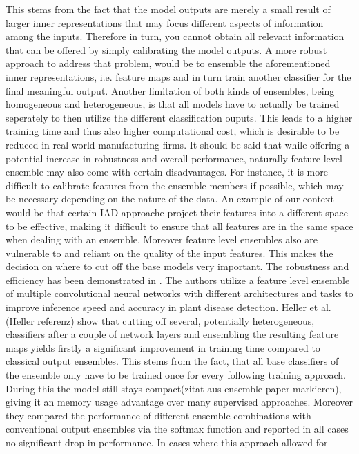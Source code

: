 This stems from the fact that the model outputs are merely a small result of larger inner representations that may focus different aspects 
of information among the inputs. Therefore in turn, you cannot obtain all relevant information that can be offered by simply calibrating the 
model outputs. A more robust approach to address that problem, would be to ensemble the aforementioned inner representations, i.e. feature maps 
and in turn train another classifier for the final meaningful output.
Another limitation of both kinds of ensembles, being homogeneous and heterogeneous, is that all models have to actually be trained 
seperately to then utilize the different classification ouputs. This leads to a higher training time and thus also higher computational 
cost, which is desirable to be reduced in real world manufacturing firms.
It should be said that while offering a potential increase in robustness and overall performance, naturally feature level ensemble may also 
come with certain disadvantages. For instance, it is more difficult to calibrate features from the ensemble members if possible, which may 
be necessary depending on the nature of the data. An example of our context would be that certain IAD approache project their features into a 
different space to be effective, making it difficult to ensure that all features are in the same space when dealing with an ensemble. 
Moreover feature level ensembles also are vulnerable to and reliant on the quality of the input features. This makes the decision on where 
to cut off the base models very important.
The robustness and efficiency has been demonstrated in \cite{EnsembleHeller2023}. The authors utilize a feature level ensemble of multiple 
convolutional neural networks with different architectures and tasks to improve inference speed and accuracy in plant disease detection.
Heller et al.(Heller referenz) show that cutting off several, potentially heterogeneous, classifiers after a couple of network layers and ensembling the 
resulting feature maps yields firstly a significant improvement in training time compared to classical output ensembles. This stems from 
the fact, that all base classifiers of the ensemble only have to be trained once for every following training approach. During this the 
model still stays compact(zitat aus ensemble paper markieren), giving it an memory usage advantage over many supervised approaches. 
Moreover they compared the performance of different ensemble combinations with conventional 
output ensembles via the softmax function and reported in all cases no significant drop in performance. In cases where this approach allowed for 
